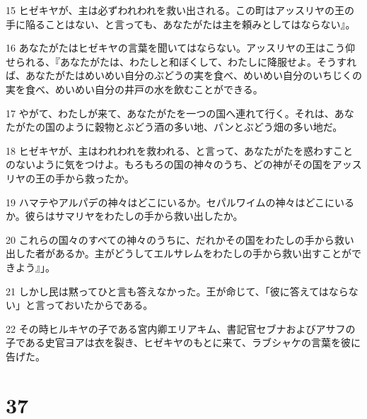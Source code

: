 \par 15 ヒゼキヤが、主は必ずわれわれを救い出される。この町はアッスリヤの王の手に陥ることはない、と言っても、あなたがたは主を頼みとしてはならない』。
\par 16 あなたがたはヒゼキヤの言葉を聞いてはならない。アッスリヤの王はこう仰せられる、『あなたがたは、わたしと和ぼくして、わたしに降服せよ。そうすれば、あなたがたはめいめい自分のぶどうの実を食べ、めいめい自分のいちじくの実を食べ、めいめい自分の井戸の水を飲むことができる。
\par 17 やがて、わたしが来て、あなたがたを一つの国へ連れて行く。それは、あなたがたの国のように穀物とぶどう酒の多い地、パンとぶどう畑の多い地だ。
\par 18 ヒゼキヤが、主はわれわれを救われる、と言って、あなたがたを惑わすことのないように気をつけよ。もろもろの国の神々のうち、どの神がその国をアッスリヤの王の手から救ったか。
\par 19 ハマテやアルパデの神々はどこにいるか。セパルワイムの神々はどこにいるか。彼らはサマリヤをわたしの手から救い出したか。
\par 20 これらの国々のすべての神々のうちに、だれかその国をわたしの手から救い出した者があるか。主がどうしてエルサレムをわたしの手から救い出すことができよう』」。
\par 21 しかし民は黙ってひと言も答えなかった。王が命じて、「彼に答えてはならない」と言っておいたからである。
\par 22 その時ヒルキヤの子である宮内卿エリアキム、書記官セブナおよびアサフの子である史官ヨアは衣を裂き、ヒゼキヤのもとに来て、ラブシャケの言葉を彼に告げた。

\chapter{37}

